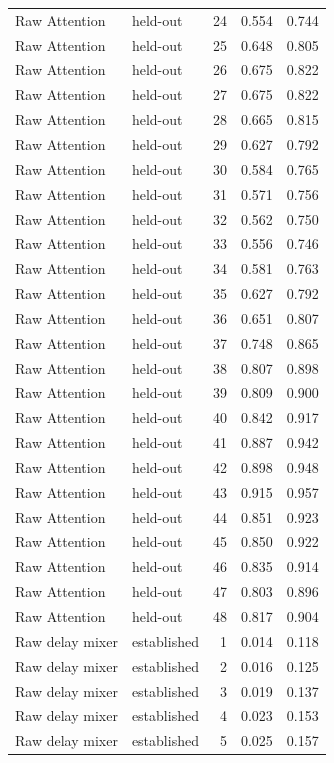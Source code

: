 \begin{tabular}{llrrr}
Raw Attention & held-out & 24 & 0.554 & 0.744 \\
Raw Attention & held-out & 25 & 0.648 & 0.805 \\
Raw Attention & held-out & 26 & 0.675 & 0.822 \\
Raw Attention & held-out & 27 & 0.675 & 0.822 \\
Raw Attention & held-out & 28 & 0.665 & 0.815 \\
Raw Attention & held-out & 29 & 0.627 & 0.792 \\
Raw Attention & held-out & 30 & 0.584 & 0.765 \\
Raw Attention & held-out & 31 & 0.571 & 0.756 \\
Raw Attention & held-out & 32 & 0.562 & 0.750 \\
Raw Attention & held-out & 33 & 0.556 & 0.746 \\
Raw Attention & held-out & 34 & 0.581 & 0.763 \\
Raw Attention & held-out & 35 & 0.627 & 0.792 \\
Raw Attention & held-out & 36 & 0.651 & 0.807 \\
Raw Attention & held-out & 37 & 0.748 & 0.865 \\
Raw Attention & held-out & 38 & 0.807 & 0.898 \\
Raw Attention & held-out & 39 & 0.809 & 0.900 \\
Raw Attention & held-out & 40 & 0.842 & 0.917 \\
Raw Attention & held-out & 41 & 0.887 & 0.942 \\
Raw Attention & held-out & 42 & 0.898 & 0.948 \\
Raw Attention & held-out & 43 & 0.915 & 0.957 \\
Raw Attention & held-out & 44 & 0.851 & 0.923 \\
Raw Attention & held-out & 45 & 0.850 & 0.922 \\
Raw Attention & held-out & 46 & 0.835 & 0.914 \\
Raw Attention & held-out & 47 & 0.803 & 0.896 \\
Raw Attention & held-out & 48 & 0.817 & 0.904 \\
Raw delay mixer & established & 1 & 0.014 & 0.118 \\
Raw delay mixer & established & 2 & 0.016 & 0.125 \\
Raw delay mixer & established & 3 & 0.019 & 0.137 \\
Raw delay mixer & established & 4 & 0.023 & 0.153 \\
Raw delay mixer & established & 5 & 0.025 & 0.157 \\

\end{tabular}
